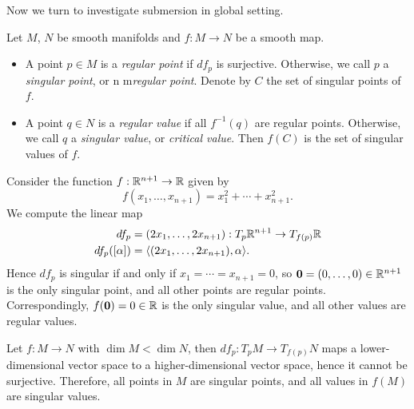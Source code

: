 Now we turn to investigate submersion in global setting.

\begin{definition}
  Let \(M\), \(N\) be smooth manifolds and \(f:M\to N\) be a smooth map.
  \begin{itemize}
    \item A point \(p\in M\) is a \emph{regular point} if \(df_p\) is surjective. Otherwise, we call \(p\) a \emph{singular point}, or n m\emph{regular point}. Denote by \(C\) the set of singular points of \(f\).
    \item A point \(q\in N\) is a \emph{regular value} if all \(f^{-1}(q)\) are regular points. Otherwise, we call \(q\) a \emph{singular value}, or \emph{critical value}. Then \(f(C)\) is the set of singular values of \(f\).
  \end{itemize}
\end{definition}

\begin{example}
  Consider the function \(f:\mathbb{R}^{n+1}\to\mathbb{R}\) given by \[
    f(x_1,\ldots,x_{n+1}) = x_1^2 + \cdots + x_{n+1}^2.
  \]
  We compute the linear map \begin{align*}
    df_p &= (2x_1, \ldots, 2x_{n+1}): T_p\mathbb{R}^{n+1}\to T_{f(p)}\mathbb{R} \\
    df_p([\alpha]) &= \langle(2x_1, \ldots, 2x_{n+1}),\alpha\rangle.
  \end{align*}
  Hence \(df_p\) is singular if and only if \(x_1 = \cdots = x_{n+1} = 0\), so \(\mathbf{0} = (0,\ldots,0)\in\mathbb{R}^{n+1}\) is the only singular point, and all other points are regular points.
  Correspondingly, \(f(\mathbf{0}) = 0\in\mathbb{R}\) is the only singular value, and all other values are regular values.
\end{example}

\begin{example}
  Let \(f:M\to N\) with \(\dim M < \dim N\), then \(df_p:T_pM\to T_{f(p)}N\) maps a lower-dimensional vector space to a higher-dimensional vector space, hence it cannot be surjective. Therefore, all points in \(M\) are singular points, and all values in \(f(M)\) are singular values.
\end{example}


